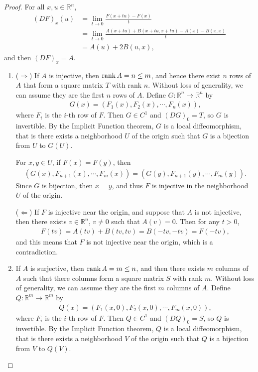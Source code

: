 \documentclass[11pt]{article}
\theoremstyle{definition}
\numberwithin{equation}{subsection}
\begin{document}
\begin{proof}
For all $x, u \in \mathbb{R}^n$,
\begin{align*}
    (DF)_x(u) & = \lim_{t\to 0} \frac{F(x + tu) - F(x)}{t} \\
    & = \lim_{t\to 0} \frac{A(x+tu) + B(x+tu,x+tu) - A(x) - B(x,x)}{t} \\
    & = A(u) + 2B(u,x),
\end{align*}
and then $(DF)_x = A$.
~\begin{enumerate}[label=(\alph*)]
    \item ($\Rightarrow$) If $A$ is injective, then $\rank A = n \leq m$, and hence there exist $n$ rows of $A$ that form a square matrix $T$ with rank $n$. Without loss of generality, we can assume they are the first $n$ rows of $A$. Define $G: \mathbb{R}^n \to \mathbb{R}^n$ by
    \begin{align*}
        G(x) = (F_1(x), F_2(x), \cdots, F_n(x)),
    \end{align*}
    where $F_i$ is the $i$-th row of $F$. Then $G \in C^1$ and $(DG)_0 = T$, so $G$ is invertible. By the Implicit Function theorem, $G$ is a local diffeomorphism, that is there exists a neighborhood $U$ of the origin such that $G$ is a bijection from $U$ to $G(U)$. 
    
    For $x, y \in U$, if $F(x) = F(y)$, then 
    \begin{align*}
        \left(G(x), F_{n+1}(x), \cdots, F_m(x) \right) = \left(G(y), F_{n+1}(y), \cdots, F_m(y) \right).
    \end{align*}
    Since $G$ is bijection, then $x = y$, and thus $F$ is injective in the neighborhood $U$ of the origin.
    
    ($\Leftarrow$) If $F$ is injective near the origin, and suppose that $A$ is not injective, then there exists $v \in \mathbb{R}^n$, $v \neq 0$ such that $A(v) = 0$. Then for any $t > 0$, 
    \begin{align*}
        F(tv) = A(tv) + B(tv,tv) = B(-tv,-tv) = F(-tv),
    \end{align*}
    and this means that $F$ is not injective near the origin, which is a contradiction.
    
    \item If $A$ is surjective, then $\rank A = m \leq n$, and then there exists $m$ columns of $A$ such that there columns form a square matrix $S$ with rank $m$. Without loss of generality, we can assume they are the first $m$ columns of $A$. Define $Q: \mathbb{R}^m \to \mathbb{R}^m$ by
    \begin{align*}
        Q(x) = \left(F_1(x,0), F_2(x,0), \cdots, F_m(x,0) \right),
    \end{align*}
    where $F_i$ is the $i$-th row of $F$. Then $Q \in C^1$ and $(DQ)_0 = S$, so $Q$ is invertible. By the Implicit Function theorem, $Q$ is a local diffeomorphism, that is there exists a neighborhood $V$ of the origin such that $Q$ is a bijection from $V$ to $Q(V)$. 
    

\end{enumerate}
\end{proof}
\end{document}
